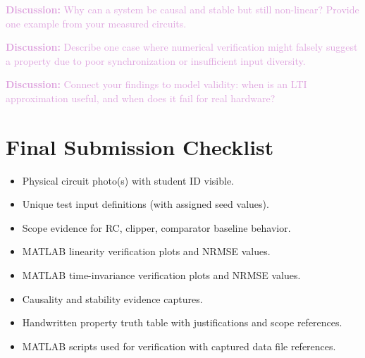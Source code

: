 \documentclass[11pt,letterpaper]{article}
\providecommand{\disECE}[1]{\textcolor{Plum}{\textbf{Discussion:} #1}}
\begin{document}
\disECE{Why can a system be causal and stable but still non-linear? Provide one example from your measured circuits.}

\disECE{Describe one case where numerical verification might falsely suggest a property due to poor synchronization or insufficient input diversity.}

\disECE{Connect your findings to model validity: when is an LTI approximation useful, and when does it fail for real hardware?}

\clearpage

\section{Final Submission Checklist}
\begin{itemize}
    \item[\(\square\)] Physical circuit photo(s) with student ID visible.
    \item[\(\square\)] Unique test input definitions (with assigned seed values).
    \item[\(\square\)] Scope evidence for RC, clipper, comparator baseline behavior.
    \item[\(\square\)] MATLAB linearity verification plots and NRMSE values.
    \item[\(\square\)] MATLAB time-invariance verification plots and NRMSE values.
    \item[\(\square\)] Causality and stability evidence captures.
    \item[\(\square\)] Handwritten property truth table with justifications and scope references.
    \item[\(\square\)] MATLAB scripts used for verification with captured data file references.
\end{itemize}

\clearpage

\end{document}

